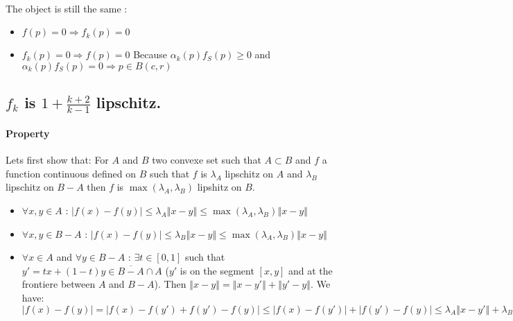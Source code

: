 \documentclass[a4paper,12pt]{article}
\begin{document}
\paragraph{} The object is still the same :
\begin{itemize}
\item $f(p)=0 \Rightarrow f_k(p)=0$
\item $f_k(p)=0 \Rightarrow f(p)=0$ Because $\alpha_k(p)f_S(p) \ge 0$ and $\alpha_k(p)f_S(p) = 0 \Rightarrow p \in B(c, r)$
\end{itemize}

\subsection*{$f_k$ is $1 + \frac{k+2}{k-1}$ lipschitz.}
\paragraph{Property} Lets first show that: For $A$ and $B$ two convexe set such that $A \subset B$ and $f$ a function continuous defined on $B$ such that $f$ is $\lambda_A$ lipschitz on $A$ and $\lambda_B$ lipschitz on $B - A$ then $f$ is $\max(\lambda_A, \lambda_B)$ lipshitz on $B$.

\begin{itemize}
	\item $\forall x, y \in A $ : $\left| f(x) - f(y) \right| \le \lambda_A \left\Vert x - y \right\Vert \le \max(\lambda_A, \lambda_B) \left\Vert x - y \right\Vert$
	\item $\forall x, y \in B-A $ : $\left| f(x) - f(y) \right| \le \lambda_B \left\Vert x - y \right\Vert \le \max(\lambda_A, \lambda_B) \left\Vert x - y \right\Vert$
	\item $\forall x \in A$ and $\forall y \in B-A$ : $\exists t \in \left[ 0, 1\right]$ such that $y' = tx + (1-t)y \in \overline{B-A} \cap A$ ($y'$ is on the segment $\left[ x, y\right]$ and at the frontiere between $A$ and $B-A$). Then $\left\Vert x - y \right\Vert = \left\Vert x - y' \right\Vert + \left\Vert y' - y \right\Vert$. 
	\newline We have: $\left| f(x) - f(y) \right| = \left| f(x) -f(y') + f(y') - f(y) \right| \le \left| f(x) -f(y') \right| + \left| f(y') - f(y) \right| \le \lambda_A \left\Vert x - y' \right\Vert + \lambda_B \left\Vert y' - y \right\Vert \le \max(\lambda_A, \lambda_B) \left\Vert x - y' \right\Vert + \max(\lambda_A, \lambda_B) \left\Vert y' - y \right\Vert = \max(\lambda_A, \lambda_B) \left\Vert x - y \right\Vert$
\end{itemize}
\end{document}

